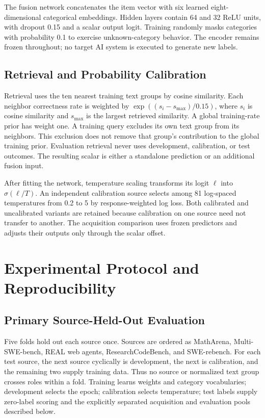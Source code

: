 \documentclass[conference]{IEEEtran}
\begin{document}
The fusion network concatenates the item vector with six learned eight-dimensional categorical embeddings. Hidden layers contain 64 and 32 ReLU units, with dropout 0.15 and a scalar output logit. Training randomly masks categories with probability 0.1 to exercise unknown-category behavior. The encoder remains frozen throughout; no target AI system is executed to generate new labels.


\subsection{Retrieval and Probability Calibration}
Retrieval uses the ten nearest training text groups by cosine similarity. Each neighbor correctness rate is weighted by $\exp((s_i-s_{\max})/0.15)$, where $s_i$ is cosine similarity and $s_{\max}$ is the largest retrieved similarity. A global training-rate prior has weight one. A training query excludes its own text group from its neighbors. This exclusion does not remove that group's contribution to the global training prior. Evaluation retrieval never uses development, calibration, or test outcomes. The resulting scalar is either a standalone prediction or an additional fusion input.

After fitting the network, temperature scaling transforms its logit $\ell$ into $\sigma(\ell/T)$. An independent calibration source selects among 81 log-spaced temperatures from 0.2 to 5 by response-weighted log loss. Both calibrated and uncalibrated variants are retained because calibration on one source need not transfer to another. The acquisition comparison uses frozen predictors and adjusts their outputs only through the scalar offset.

\section{Experimental Protocol and Reproducibility}
\subsection{Primary Source-Held-Out Evaluation}
Five folds hold out each source once. Sources are ordered as MathArena, Multi-SWE-bench, REAL web agents, ResearchCodeBench, and SWE-rebench. For each test source, the next source cyclically is development, the next is calibration, and the remaining two supply training data. Thus no source or normalized text group crosses roles within a fold. Training learns weights and category vocabularies; development selects the epoch; calibration selects temperature; test labels supply zero-label scoring and the explicitly separated acquisition and evaluation pools described below.
\end{document}
